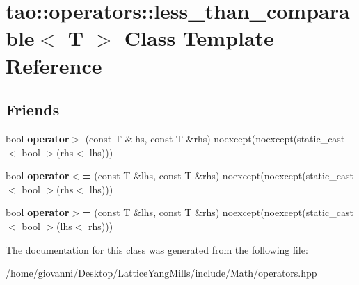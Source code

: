\hypertarget{classtao_1_1operators_1_1less__than__comparable_3_01T_01_4}{}\section{tao\+:\+:operators\+:\+:less\+\_\+than\+\_\+comparable$<$ T $>$ Class Template Reference}
\label{classtao_1_1operators_1_1less__than__comparable_3_01T_01_4}
\subsection*{Friends}
\begin{DoxyCompactItemize}
\item 
bool {\bfseries operator$>$} (const T \&lhs, const T \&rhs) noexcept(noexcept(static\+\_\+cast$<$ bool $>$(rhs$<$ lhs)))\hypertarget{classtao_1_1operators_1_1less__than__comparable_3_01T_01_4_aa86cc8d7ef85b5972d338294623c4310}{}\label{classtao_1_1operators_1_1less__than__comparable_3_01T_01_4_aa86cc8d7ef85b5972d338294623c4310}

\item 
bool {\bfseries operator$<$=} (const T \&lhs, const T \&rhs) noexcept(noexcept(static\+\_\+cast$<$ bool $>$(rhs$<$ lhs)))\hypertarget{classtao_1_1operators_1_1less__than__comparable_3_01T_01_4_abe5efb51dd0d74d65b742a8f7481a298}{}\label{classtao_1_1operators_1_1less__than__comparable_3_01T_01_4_abe5efb51dd0d74d65b742a8f7481a298}

\item 
bool {\bfseries operator$>$=} (const T \&lhs, const T \&rhs) noexcept(noexcept(static\+\_\+cast$<$ bool $>$(lhs$<$ rhs)))\hypertarget{classtao_1_1operators_1_1less__than__comparable_3_01T_01_4_a2f3d47074131c7c083222240fc113d98}{}\label{classtao_1_1operators_1_1less__than__comparable_3_01T_01_4_a2f3d47074131c7c083222240fc113d98}

\end{DoxyCompactItemize}


The documentation for this class was generated from the following file\+:\begin{DoxyCompactItemize}
\item 
/home/giovanni/\+Desktop/\+Lattice\+Yang\+Mills/include/\+Math/operators.\+hpp\end{DoxyCompactItemize}
